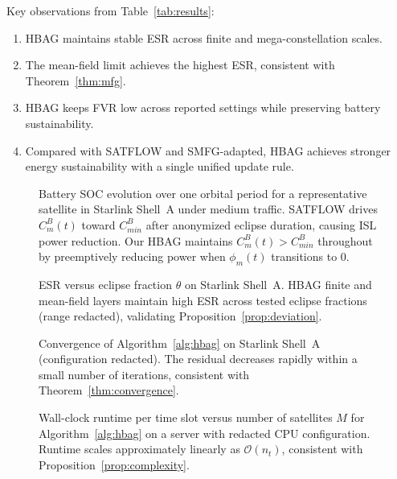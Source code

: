 \documentclass[journal]{IEEEtran}
\newcommand{\CB}{C^{B}}
\newcommand{\CBmin}{C^{B}_{min}}
\begin{document}
Key observations from Table~\ref{tab:results}:

\begin{enumerate}
    \item HBAG maintains stable ESR across finite and mega-constellation scales.
    \item The mean-field limit achieves the highest ESR, consistent with Theorem~\ref{thm:mfg}.
    \item HBAG keeps FVR low across reported settings while preserving battery sustainability.
    \item Compared with SATFLOW and SMFG-adapted, HBAG achieves stronger energy sustainability with a single unified update rule.
\end{enumerate}

\begin{figure}[t]
\centering
\caption{Battery SOC evolution over one orbital
period for a representative satellite in
Starlink Shell~A under medium traffic.
SATFLOW drives $\CB_m(t)$ toward $\CBmin$ after
anonymized eclipse duration, causing ISL power reduction.
Our HBAG maintains $\CB_m(t)>\CBmin$ throughout by
preemptively reducing power when $\phi_m(t)$
transitions to 0.}
\label{fig:soc}
\end{figure}

\begin{figure}[t]
\centering
\caption{ESR versus eclipse fraction $\theta$ on
Starlink Shell~A. HBAG finite and mean-field layers maintain
high ESR across tested eclipse fractions (range redacted), validating
Proposition~\ref{prop:deviation}.}
\label{fig:esr_theta}
\end{figure}

\begin{figure}[t]
\centering
\caption{Convergence of Algorithm~\ref{alg:hbag}
on Starlink Shell~A (configuration redacted).
The residual decreases rapidly within a small number
of iterations, consistent with
Theorem~\ref{thm:convergence}.}
\label{fig:convergence}
\end{figure}

\begin{figure}[t]
\centering
\caption{Wall-clock runtime per time slot versus
number of satellites $M$ for
Algorithm~\ref{alg:hbag} on a server with
redacted CPU configuration. Runtime scales approximately linearly
as $\mathcal{O}(n_t)$, consistent with
Proposition~\ref{prop:complexity}.}
\label{fig:runtime}
\end{figure}
\end{document}
